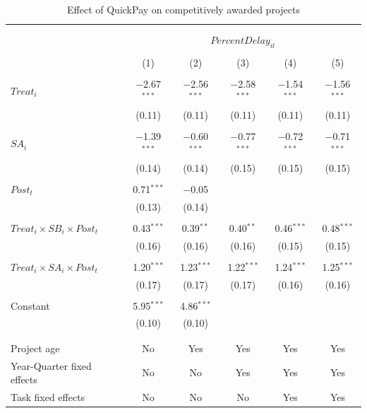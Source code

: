 \documentclass[
]{article}
\begin{document}
\begin{table}[H] \centering 
  \caption{Effect of QuickPay on competitively awarded projects} 
  \label{} 
\small 
\begin{tabular}{@{\extracolsep{-2pt}}lccccc} 
\\[-1.8ex]\hline 
\hline \\[-1.8ex] 
\\[-1.8ex] & \multicolumn{5}{c}{$PercentDelay_{it}$  } \\ 
\\[-1.8ex] & (1) & (2) & (3) & (4) & (5)\\ 
\hline \\[-1.8ex] 
 $Treat_i$ & $-$2.67$^{***}$ & $-$2.56$^{***}$ & $-$2.58$^{***}$ & $-$1.54$^{***}$ & $-$1.56$^{***}$ \\ 
  & (0.11) & (0.11) & (0.11) & (0.11) & (0.11) \\ 
  & & & & & \\ 
 $SA_i$ & $-$1.39$^{***}$ & $-$0.60$^{***}$ & $-$0.77$^{***}$ & $-$0.72$^{***}$ & $-$0.71$^{***}$ \\ 
  & (0.14) & (0.14) & (0.15) & (0.15) & (0.15) \\ 
  & & & & & \\ 
 $Post_t$ & 0.71$^{***}$ & $-$0.05 &  &  &  \\ 
  & (0.13) & (0.14) &  &  &  \\ 
  & & & & & \\ 
 $Treat_i \times SB_i \times Post_t$ & 0.43$^{***}$ & 0.39$^{**}$ & 0.40$^{**}$ & 0.46$^{***}$ & 0.48$^{***}$ \\ 
  & (0.16) & (0.16) & (0.16) & (0.15) & (0.15) \\ 
  & & & & & \\ 
 $Treat_i \times SA_i \times Post_t$ & 1.20$^{***}$ & 1.23$^{***}$ & 1.22$^{***}$ & 1.24$^{***}$ & 1.25$^{***}$ \\ 
  & (0.17) & (0.17) & (0.17) & (0.16) & (0.16) \\ 
  & & & & & \\ 
 Constant & 5.95$^{***}$ & 4.86$^{***}$ &  &  &  \\ 
  & (0.10) & (0.10) &  &  &  \\ 
  & & & & & \\ 
\hline \\[-1.8ex] 
Project age & No & Yes & Yes & Yes & Yes \\ 
Year-Quarter fixed effects & No & No & Yes & Yes & Yes \\ 
Task fixed effects & No & No & No & Yes & Yes \\ 

\end{tabular}
\end{table}
\end{document}
